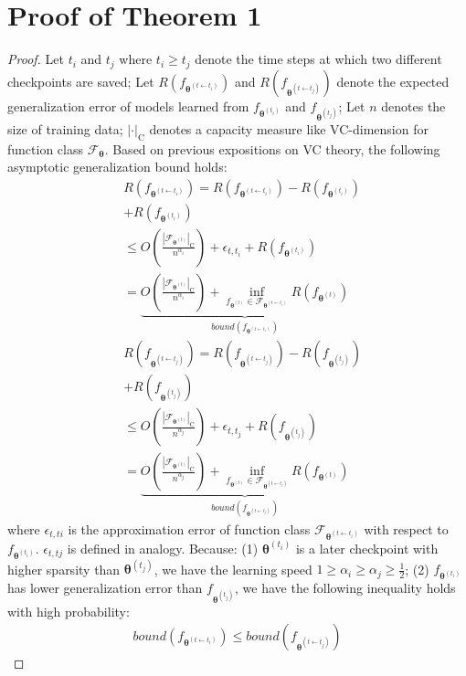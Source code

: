 \section{Proof of Theorem 1}
\label{sec:B}
\begin{proof}
	Let $t_i$ and $t_{j}$ where $t_{i}\geq t_{j}$ denote the time steps at which two different checkpoints are saved; Let $R(f_{\bm{\theta}^{(t\leftarrow t_i)}})$ and $R(f_{\bm{\theta}^{(t\leftarrow t_j)}})$ denote the expected generalization error of models learned from  $f_{\bm{\theta}^{(t_i)}}$ and $f_{\bm{\theta}^{(t_j)}}$; Let $n$ denotes the size of training data; $|\cdot|_{\text{C}}$ denotes a capacity measure like VC-dimension for function class $\mathcal{F}_{\bm{\theta}}$. Based on previous expositions on VC theory, the following asymptotic generalization bound holds:
	\begin{align}\nonumber
        & R(f_{\bm{\theta}^{(t\leftarrow t_i)}})=R(f_{\bm{\theta}^{(t\leftarrow t_i)}})-R(f_{\bm{\theta}^{(t_i)}}) \\ \nonumber
        & +R(f_{\bm{\theta}^{(t_i)}}) \\ \nonumber
		&\leq O(\frac{|\mathcal{F}_{\bm{\theta}^{(t)}}|_{\text{C}}}{n^{\alpha_{i}}})+ \epsilon_{t,t_i} + R(f_{\bm{\theta}^{(t_i)}}) \\ \nonumber 
		&=  \underbrace{O(\frac{|\mathcal{F}_{\bm{\theta}^{(t)}}|_{\text{C}}}{n^{\alpha_{i}}}) + \underset{f_{\bm{\theta}^{(t)}}\in \mathcal{F}_{\bm{\theta}^{(t\leftarrow t_i)}}}{\inf}R(f_{\bm{\theta}^{(t)}})}_{bound(f_{\bm{\theta}^{(t\leftarrow t_i)}})} \\ \nonumber
        &R(f_{\bm{\theta}^{(t\leftarrow t_j)}})=R(f_{\bm{\theta}^{(t\leftarrow t_j)}})-R(f_{\bm{\theta}^{(t_j)}})\\ \nonumber 
        &+R(f_{\bm{\theta}^{(t_j)}}) \\ \nonumber
		&\leq O(\frac{|\mathcal{F}_{\bm{\theta}^{(t)}}|_{\text{C}}}{n^{\alpha_{j}}})+ \epsilon_{t,t_j} + R(f_{\bm{\theta}^{(t_j)}}) \\ \nonumber 
		&=  \underbrace{O(\frac{|\mathcal{F}_{\bm{\theta}^{(t)}}|_{\text{C}}}{n^{\alpha_{j}}}) + \underset{f_{\bm{\theta}^{(t)}}\in \mathcal{F}_{\bm{\theta}^{(t\leftarrow t_j)}}}{\inf}R(f_{\bm{\theta}^{(t)}})}_{bound(f_{\bm{\theta}^{(t\leftarrow t_j)}})}
	\end{align}
	where $\epsilon_{t,ti}$ is the approximation error of function class $\mathcal{F}_{\bm{\theta}^{(t\leftarrow t_i)}}$ with respect to $f_{\bm{\theta}^{(t_i)}}$. $\epsilon_{t,tj}$ is defined in analogy.
	Because: (1) $\bm{\theta}^{(t_i)}$ is a later checkpoint with higher sparsity than $\bm{\theta}^{(t_j)}$, we have the learning speed $1\geq \alpha_{i}\geq \alpha_{j}\geq \frac{1}{2}$; (2) $f_{\bm{\theta}^{(t_i)}}$ has lower generalization error than $f_{\bm{\theta}^{(t_j)}}$, we have the following inequality holds with high probability:
	\begin{align}\nonumber
		bound(f_{\bm{\theta}^{(t\leftarrow t_i)}}) \leq bound(f_{\bm{\theta}^{(t\leftarrow t_j)}})
	\end{align}
\end{proof}
